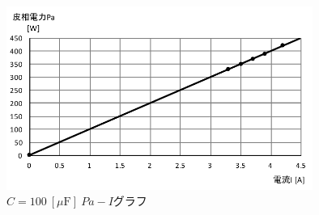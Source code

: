 \documentclass[uplatex]{jsarticle}
\begin{document}
        \begin{figure}[h]
            \centering
            \includegraphics[width = 10cm]{gurahu8.pdf}
            \caption{$C = 100 \ [\mu \mathrm F] \ Pa-I$グラフ}
        \end{figure}
    \clearpage
\end{document}
